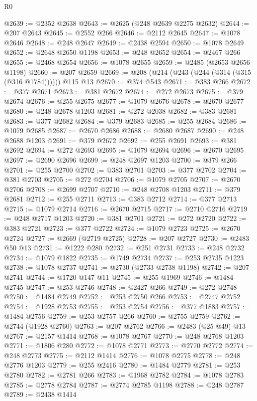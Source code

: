 \begin{lexlean}{R0}
\begin{coremodule}
@2639 := @2352 @2638
@2643 := @2625 (@248 @2639 @2275 @2632)
@2644 := @207 @2643
@2645 := @2552 @266
@2646 := @2112 @2645
@2647 := @1078 @2646
@2648 := @248 @2647
@2649 := @2438 @2594
@2650 := @1078 @2649
@2652 := @2648 @2650 @1198
@2653 := @248 @2652
@2654 := @2467 @266
@2655 := @2468 @2654
@2656 := @1078 @2655
@2659 := @2485 (@2653 @2656 @1198)
@2660 := @207 @2659
@2669 := @208 (@214 (@243 (@244 (@314 (@315 (@316 @1784)))))) @115 @13
@2670 := @374 @543
@2671 := @383 @266
@2672 := @377 @2671
@2673 := @381 @2672
@2674 := @272 @2673
@2675 := @379 @2674
@2676 := @255 @2675
@2677 := @1079 @2676
@2678 := @2670 @2677
@2680 := @248 @2678 @1203
@2681 := @272 @2038
@2682 := @383 @2681
@2683 := @377 @2682
@2684 := @379 @2683
@2685 := @255 @2684
@2686 := @1079 @2685
@2687 := @2670 @2686
@2688 := @2680 @2687
@2690 := @248 @2688 @1203
@2691 := @379 @2672
@2692 := @255 @2691
@2693 := @381 @2692
@2694 := @272 @2693
@2695 := @1079 @2694
@2696 := @2670 @2695
@2697 := @2690 @2696
@2699 := @248 @2697 @1203
@2700 := @379 @266
@2701 := @255 @2700
@2702 := @383 @2701
@2703 := @377 @2702
@2704 := @381 @2703
@2705 := @272 @2704
@2706 := @1079 @2705
@2707 := @2670 @2706
@2708 := @2699 @2707
@2710 := @248 @2708 @1203
@2711 := @379 @2681
@2712 := @255 @2711
@2713 := @383 @2712
@2714 := @377 @2713
@2715 := @1079 @2714
@2716 := @2670 @2715
@2717 := @2710 @2716
@2719 := @248 @2717 @1203
@2720 := @381 @2701
@2721 := @272 @2720
@2722 := @383 @2721
@2723 := @377 @2722
@2724 := @1079 @2723
@2725 := @2670 @2724
@2727 := @2669 (@2719 @2725)
@2728 := @207 @2727
@2730 := @2483 @50 @13
@2731 := @1222 @280
@2732 := @251 @2731
@2733 := @248 @2732
@2734 := @1079 @1822
@2735 := @1749 @2734
@2737 := @253 @2735 @1223
@2738 := @1078 @2737
@2741 := @2730 (@2733 @2738 @1198)
@2742 := @207 @2741
@2744 := @1720 @147 @11
@2745 := @255 @1969
@2746 := @1484 @2745
@2747 := @253 @2746
@2748 := @2427 @266
@2749 := @272 @2748
@2750 := @1484 @2749
@2752 := @253 @2750 @266
@2753 := @2747 @2752
@2754 := @1928 @2753
@2755 := @253 @2754
@2756 := @377 @1883
@2757 := @1484 @2756
@2759 := @253 @2757 @266
@2760 := @2755 @2759
@2762 := @2744 (@1928 @2760)
@2763 := @207 @2762
@2766 := @2483 (@25 @49) @13
@2767 := @2157 @1414
@2768 := @1078 @2767
@2770 := @248 @2768 @1203
@2771 := @1806 @280
@2772 := @1078 @2771
@2773 := @2770 @2772
@2774 := @248 @2773
@2775 := @2112 @1414
@2776 := @1078 @2775
@2778 := @248 @2776 @1203
@2779 := @255 @2416
@2780 := @1484 @2779
@2781 := @253 @2780
@2782 := @2781 @266
@2783 := @1968 @2782
@2784 := @1078 @2783
@2785 := @2778 @2784
@2787 := @2774 @2785 @1198
@2788 := @248 @2787
@2789 := @2438 @1414

\end{coremodule}
\end{lexlean}
